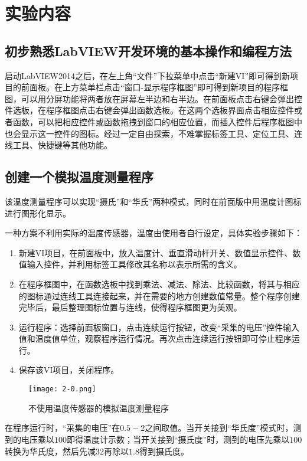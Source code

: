 \documentclass[12pt]{article}
\begin{document}
\section{实验内容}

\subsection{初步熟悉LabVIEW开发环境的基本操作和编程方法}
启动LabVIEW2014之后，在左上角“文件”下拉菜单中点击“新建VI”即可得到新项目的前面板。在上方菜单栏点击“窗口-显示程序框图”即可得到新项目的程序框图，可以用分屏功能将两者放在屏幕左半边和右半边。在前面板点击右键会弹出控件选板，在程序框图点击右键会弹出函数选板。在这两个选板界面点击相应控件或者函数，可以把相应控件或函数拖拽到窗口的相应位置，而插入控件后程序框图中也会显示这一控件的图标。经过一定自由探索，不难掌握标签工具、定位工具、连线工具、快捷键等其他功能。

\subsection{创建一个模拟温度测量程序}
该温度测量程序可以实现“摄氏”和“华氏”两种模式，同时在前面版中用温度计图标进行图形化显示。

一种方案不利用实际的温度传感器，温度由使用者自行设定，具体实验步骤如下：

\begin{enumerate}
    \item 新建VI项目，在前面板中，放入温度计、垂直滑动杆开关、数值显示控件、数值输入控件，并利用标签工具修改其名称以表示所需的含义。
    \item 在程序框图中，在函数选板中找到乘法、减法、除法、比较函数，将其与相应的图标通过连线工具连接起来，并在需要的地方创建数值常量。整个程序创建完毕后，最后整理图标位置与连线，使得程序框图更为美观。
    \item 运行程序：选择前面板窗口，点击连续运行按钮，改变“采集的电压”控件输入值和温度值单位，观察程序运行情况。再次点击连续运行按钮即可停止程序运行。
    \item 保存该VI项目，关闭程序。
\end{enumerate}

\begin{figure}[h!]
    \centering
    \texttt{[image: 2-0.png]}
    \caption{不使用温度传感器的模拟温度测量程序}
\end{figure}

在程序运行时，“采集的电压”在$0.5-2$之间取值。当开关接到“华氏度”模式时，测到的电压乘以$100$即得温度计示数；当开关接到“摄氏度”时，测到的电压先乘以$100$转换为华氏度，然后先减$32$再除以$1.8
$得到摄氏度。
\end{document}
